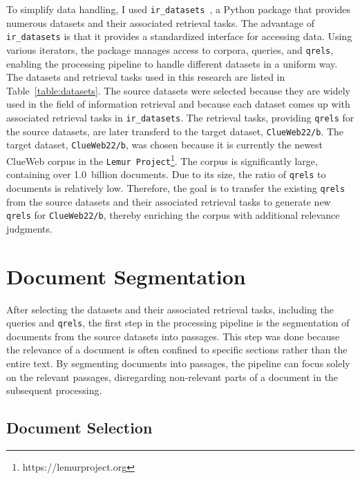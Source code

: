 To simplify data handling, I used \texttt{ir\_datasets}~\citep{macavaney:2021}, a Python package that provides numerous datasets and their associated retrieval tasks. The advantage of \texttt{ir\_datasets} is that it provides a standardized interface for accessing data. Using various iterators, the package manages access to corpora, queries, and \texttt{qrels}, enabling the processing pipeline to handle different datasets in a uniform way. The datasets and retrieval tasks used in this research are listed in Table~\ref{table:datasets}. The source datasets were selected because they are widely used in the field of information retrieval and because each dataset comes up with associated retrieval tasks in \texttt{ir\_datasets}. The retrieval tasks, providing \texttt{qrels} for the source datasets, are later transferd to the target dataset, \texttt{ClueWeb22/b}. The target dataset, \texttt{ClueWeb22/b}, was chosen because it is currently the newest ClueWeb corpus in the \texttt{Lemur Project}\footnote{https://lemurproject.org}. The corpus is significantly large, containing over 1.0~billion documents. Due to its size, the ratio of \texttt{qrels} to documents is relatively low. Therefore, the goal is to transfer the existing \texttt{qrels} from the source datasets and their associated retrieval tasks to generate new \texttt{qrels} for \texttt{ClueWeb22/b}, thereby enriching the corpus with additional relevance judgments. 


\section{Document Segmentation}\label{document-segmentation}

After selecting the datasets and their associated retrieval tasks, including the queries and \texttt{qrels}, the first step in the processing pipeline is the segmentation of documents from the source datasets into passages. This step was done because the relevance of a document is often confined to specific sections rather than the entire text. By segmenting documents into passages, the pipeline can focus solely on the relevant passages, disregarding non-relevant parts of a document in the subsequent processing.

\subsection{Document Selection}\label{document-selection}

